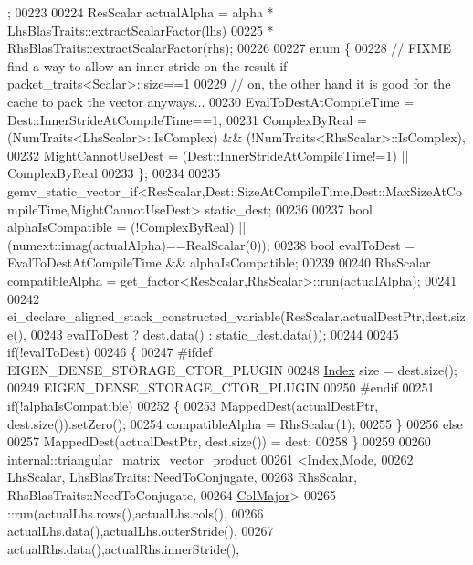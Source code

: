 \begin{DoxyCode}
      ;
00223 
00224     ResScalar actualAlpha = alpha * LhsBlasTraits::extractScalarFactor(lhs)
00225                                   * RhsBlasTraits::extractScalarFactor(rhs);
00226 
00227     \textcolor{keyword}{enum} \{
00228       \textcolor{comment}{// FIXME find a way to allow an inner stride on the result if packet\_traits<Scalar>::size==1}
00229       \textcolor{comment}{// on, the other hand it is good for the cache to pack the vector anyways...}
00230       EvalToDestAtCompileTime = Dest::InnerStrideAtCompileTime==1,
00231       ComplexByReal = (NumTraits<LhsScalar>::IsComplex) && (!NumTraits<RhsScalar>::IsComplex),
00232       MightCannotUseDest = (Dest::InnerStrideAtCompileTime!=1) || ComplexByReal
00233     \};
00234 
00235     gemv\_static\_vector\_if<ResScalar,Dest::SizeAtCompileTime,Dest::MaxSizeAtCompileTime,MightCannotUseDest> 
      static\_dest;
00236 
00237     \textcolor{keywordtype}{bool} alphaIsCompatible = (!ComplexByReal) || (numext::imag(actualAlpha)==RealScalar(0));
00238     \textcolor{keywordtype}{bool} evalToDest = EvalToDestAtCompileTime && alphaIsCompatible;
00239 
00240     RhsScalar compatibleAlpha = get\_factor<ResScalar,RhsScalar>::run(actualAlpha);
00241 
00242     ei\_declare\_aligned\_stack\_constructed\_variable(ResScalar,actualDestPtr,dest.size(),
00243                                                   evalToDest ? dest.data() : static\_dest.data());
00244 
00245     \textcolor{keywordflow}{if}(!evalToDest)
00246     \{
00247 \textcolor{preprocessor}{      #ifdef EIGEN\_DENSE\_STORAGE\_CTOR\_PLUGIN}
00248       \hyperlink{namespace_eigen_a62e77e0933482dafde8fe197d9a2cfde}{Index} size = dest.size();
00249       EIGEN\_DENSE\_STORAGE\_CTOR\_PLUGIN
00250 \textcolor{preprocessor}{      #endif}
00251       \textcolor{keywordflow}{if}(!alphaIsCompatible)
00252       \{
00253         MappedDest(actualDestPtr, dest.size()).setZero();
00254         compatibleAlpha = RhsScalar(1);
00255       \}
00256       \textcolor{keywordflow}{else}
00257         MappedDest(actualDestPtr, dest.size()) = dest;
00258     \}
00259 
00260     internal::triangular\_matrix\_vector\_product
00261       <\hyperlink{namespace_eigen_a62e77e0933482dafde8fe197d9a2cfde}{Index},Mode,
00262        LhsScalar, LhsBlasTraits::NeedToConjugate,
00263        RhsScalar, RhsBlasTraits::NeedToConjugate,
00264        \hyperlink{group__enums_ggaacded1a18ae58b0f554751f6cdf9eb13a0cbd4bdd0abcfc0224c5fcb5e4f6669a}{ColMajor}>
00265       ::run(actualLhs.rows(),actualLhs.cols(),
00266             actualLhs.data(),actualLhs.outerStride(),
00267             actualRhs.data(),actualRhs.innerStride(),

\end{DoxyCode}
